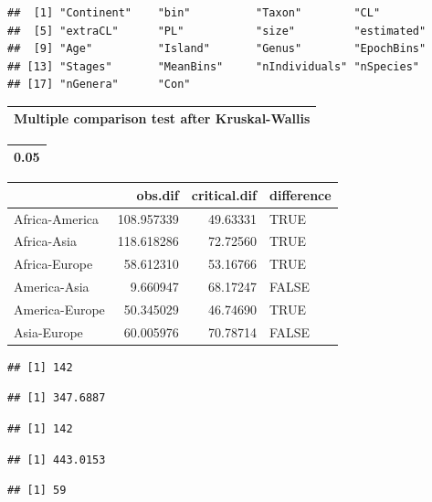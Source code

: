 \documentclass[]{article}
\begin{document}
\begin{verbatim}
##  [1] "Continent"    "bin"          "Taxon"        "CL"          
##  [5] "extraCL"      "PL"           "size"         "estimated"   
##  [9] "Age"          "Island"       "Genus"        "EpochBins"   
## [13] "Stages"       "MeanBins"     "nIndividuals" "nSpecies"    
## [17] "nGenera"      "Con"
\end{verbatim}

\begin{table}

\centering
\begin{tabular}[t]{l}
\hline
Multiple comparison test after Kruskal-Wallis\\
\hline
\end{tabular}
\centering
\begin{tabular}[t]{r}
\hline
0.05\\
\hline
\end{tabular}
\centering
\begin{tabular}[t]{l|r|r|l}
\hline
  & obs.dif & critical.dif & difference\\
\hline
Africa-America & 108.957339 & 49.63331 & TRUE\\
\hline
Africa-Asia & 118.618286 & 72.72560 & TRUE\\
\hline
Africa-Europe & 58.612310 & 53.16766 & TRUE\\
\hline
America-Asia & 9.660947 & 68.17247 & FALSE\\
\hline
America-Europe & 50.345029 & 46.74690 & TRUE\\
\hline
Asia-Europe & 60.005976 & 70.78714 & FALSE\\
\hline
\end{tabular}
\end{table}

\begin{verbatim}
## [1] 142
\end{verbatim}

\begin{verbatim}
## [1] 347.6887
\end{verbatim}

\begin{verbatim}
## [1] 142
\end{verbatim}

\begin{verbatim}
## [1] 443.0153
\end{verbatim}

\begin{verbatim}
## [1] 59
\end{verbatim}
\end{document}
